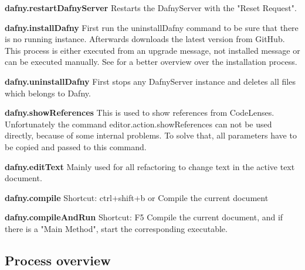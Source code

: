 \textbf{dafny.restartDafnyServer}
Restarts the DafnyServer with the "Reset Request".\newline

\textbf{dafny.installDafny}
First run the uninstallDafny command to be sure that there is no running instance. Afterwards downloads the latest version from GitHub. This process is either executed from an upgrade message, not installed message or can be executed manually. 
See  for a better overview over the installation process. \newline

\textbf{dafny.uninstallDafny}
First stops any DafnyServer instance and deletes all files which belongs to Dafny. \newline

\textbf{dafny.showReferences}
This is used to show references from CodeLenses. Unfortunately the command editor.action.showReferences can not be used directly, because of some internal problems. To solve that, all parameters have to be copied and passed to this command. \newline

\textbf{dafny.editText}
Mainly used for all refactoring to change text in the active text document. \newline

\textbf{dafny.compile}
Shortcut: ctrl+shift+b or %
\newline
Compile the current document \newline

\textbf{dafny.compileAndRun}
Shortcut: F5
\newline
Compile the current document, and if there is a "Main Method", start the corresponding executable. \newline


\subsection{Process overview}
